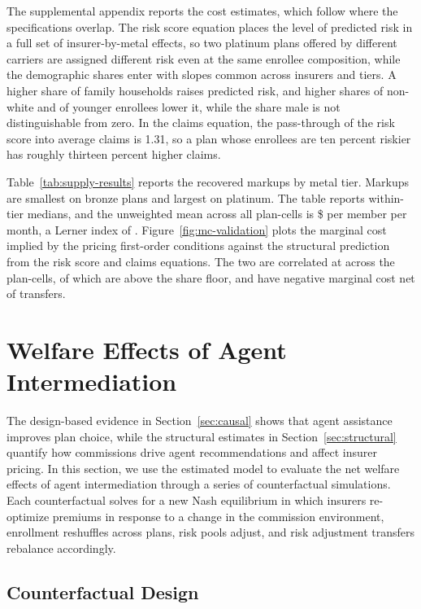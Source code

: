 \documentclass[12pt]{article}
\begin{document}
The supplemental appendix reports the cost estimates, which follow \cite{saltzman2019} where the specifications overlap. The risk score equation places the level of predicted risk in a full set of insurer-by-metal effects, so two platinum plans offered by different carriers are assigned different risk even at the same enrollee composition, while the demographic shares enter with slopes common across insurers and tiers. A higher share of family households raises predicted risk, and higher shares of non-white and of younger enrollees lower it, while the share male is not distinguishable from zero. In the claims equation, the pass-through of the risk score into average claims is 1.31, so a plan whose enrollees are ten percent riskier has roughly thirteen percent higher claims.

Table~\ref{tab:supply-results} reports the recovered markups by metal tier. Markups are smallest on bronze plans and largest on platinum. The table reports within-tier medians, and the unweighted mean across all plan-cells is \$\meanMarkup{} per member per month, a Lerner index of \meanLerner{}. Figure~\ref{fig:mc-validation} plots the marginal cost implied by the pricing first-order conditions against the structural prediction from the risk score and claims equations. The two are correlated at \mcFitCorr{} across the \nPlanCells{} plan-cells, of which \nPlanCellsFOC{} are above the share floor, and \nNegMC{} have negative marginal cost net of transfers.

\section{Welfare Effects of Agent Intermediation}
\label{sec:welfare}

The design-based evidence in Section~\ref{sec:causal} shows that agent assistance improves plan choice, while the structural estimates in Section~\ref{sec:structural} quantify how commissions drive agent recommendations and affect insurer pricing. In this section, we use the estimated model to evaluate the net welfare effects of agent intermediation through a series of counterfactual simulations. Each counterfactual solves for a new Nash equilibrium in which insurers re-optimize premiums in response to a change in the commission environment, enrollment reshuffles across plans, risk pools adjust, and risk adjustment transfers rebalance accordingly.

\subsection{Counterfactual Design}
\label{subsec:cf_design}
\end{document}
